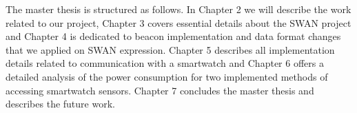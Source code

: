 The master thesis is structured as follows. In Chapter 2 we will describe the work related to our project, Chapter 3 covers  essential details about the SWAN project and Chapter 4 is dedicated to 
beacon implementation and data format changes that we applied on SWAN  expression. Chapter 5 describes all implementation details related to  communication
with a smartwatch and Chapter 6 offers a detailed analysis of the power consumption for two implemented methods of accessing smartwatch sensors. Chapter 7 concludes the master thesis and describes 
the future work.
